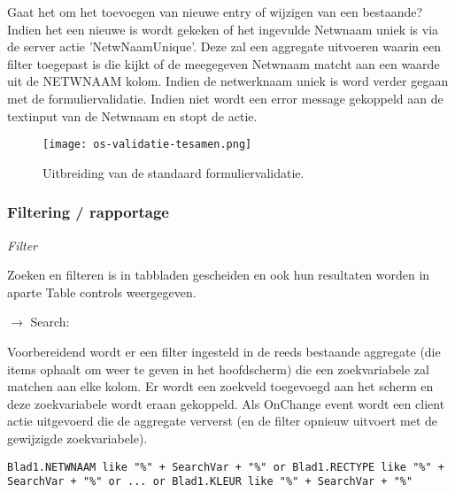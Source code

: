 Gaat het om het toevoegen van nieuwe entry of wijzigen van een bestaande? Indien het een nieuwe is wordt gekeken of het ingevulde Netwnaam uniek is via de server actie 'NetwNaamUnique'. Deze zal een aggregate uitvoeren waarin een filter toegepast is  die kijkt of de meegegeven Netwnaam matcht aan een waarde uit de NETWNAAM kolom. Indien de netwerknaam uniek is word verder gegaan met de formuliervalidatie. Indien niet wordt een error message gekoppeld aan de textinput van de Netwnaam en stopt de actie.

\begin{figure}[h!]
    \texttt{[image: os-validatie-tesamen.png]}
    \caption{Uitbreiding van de standaard formuliervalidatie.}
    \label{fig:os-validatie-tesamen}
\end{figure}

\subsubsection{Filtering / rapportage}

\textit{Filter}

Zoeken en filteren is in tabbladen gescheiden en ook hun resultaten worden in aparte Table controls weergegeven.

$\rightarrow$ Search:

Voorbereidend wordt er een filter ingesteld in de reeds bestaande aggregate (die items ophaalt om weer te geven in het hoofdscherm) die een zoekvariabele zal matchen aan elke kolom.
Er wordt een zoekveld toegevoegd aan het scherm en deze zoekvariabele wordt eraan gekoppeld. Als OnChange event wordt een client actie uitgevoerd die de aggregate ververst (en de filter opnieuw uitvoert met de gewijzigde zoekvariabele).

\begin{lstlisting}
Blad1.NETWNAAM like "%" + SearchVar + "%" or Blad1.RECTYPE like "%" + SearchVar + "%" or ... or Blad1.KLEUR like "%" + SearchVar + "%"
\end{lstlisting}

